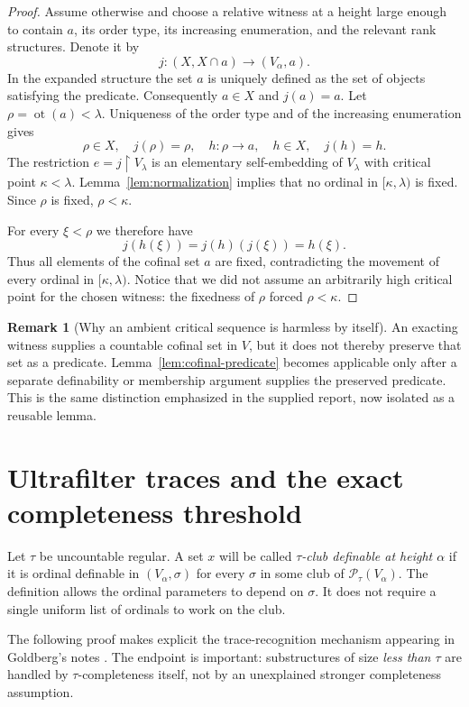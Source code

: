\documentclass[11pt,letterpaper]{article}
\theoremstyle{definition}
\newcommand{\ot}{\operatorname{ot}}
\newcommand{\restr}{\mathbin{\upharpoonright}}
\newtheorem{remark}[definition]{Remark}
\newcommand{\PP}{\mathcal P}
\begin{document}
\begin{proof}
Assume otherwise and choose a relative witness at a height large enough to contain $a$, its order type, its increasing enumeration, and the relevant rank structures. Denote it by
\[
 j:(X,X\cap a)\longrightarrow(V_\alpha,a).
\]
In the expanded structure the set $a$ is uniquely defined as the set of objects satisfying the predicate. Consequently $a\in X$ and $j(a)=a$. Let $\rho=\ot(a)<\lambda$. Uniqueness of the order type and of the increasing enumeration gives
\[
 \rho\in X,\quad j(\rho)=\rho,\quad
 h:\rho\longrightarrow a,\quad h\in X,\quad j(h)=h.
\]
The restriction $e=j\restr V_\lambda$ is an elementary self-embedding of $V_\lambda$ with critical point $\kappa<\lambda$. Lemma~\ref{lem:normalization} implies that no ordinal in $[\kappa,\lambda)$ is fixed. Since $\rho$ is fixed, $\rho<\kappa$.

For every $\xi<\rho$ we therefore have
\[
 j(h(\xi))=j(h)(j(\xi))=h(\xi).
\]
Thus all elements of the cofinal set $a$ are fixed, contradicting the movement of every ordinal in $[\kappa,\lambda)$. Notice that we did not assume an arbitrarily high critical point for the chosen witness: the fixedness of $\rho$ forced $\rho<\kappa$.
\end{proof}

\begin{remark}[Why an ambient critical sequence is harmless by itself]
An exacting witness supplies a countable cofinal set in $V$, but it does not thereby preserve that set as a predicate. Lemma~\ref{lem:cofinal-predicate} becomes applicable only after a separate definability or membership argument supplies the preserved predicate. This is the same distinction emphasized in the supplied report, now isolated as a reusable lemma.
\end{remark}

\section{Ultrafilter traces and the exact completeness threshold}\label{sec:ultrafilter}

Let $\tau$ be uncountable regular. A set $x$ will be called \emph{$\tau$-club definable at height $\alpha$} if it is ordinal definable in $(V_\alpha,\sigma)$ for every $\sigma$ in some club of $\PP_\tau(V_\alpha)$. The definition allows the ordinal parameters to depend on $\sigma$. It does not require a single uniform list of ordinals to work on the club.

The following proof makes explicit the trace-recognition mechanism appearing in Goldberg's notes \cite[p.~10]{cover}. The endpoint is important: substructures of size \emph{less than $\tau$} are handled by $\tau$-completeness itself, not by an unexplained stronger completeness assumption.
\end{document}
